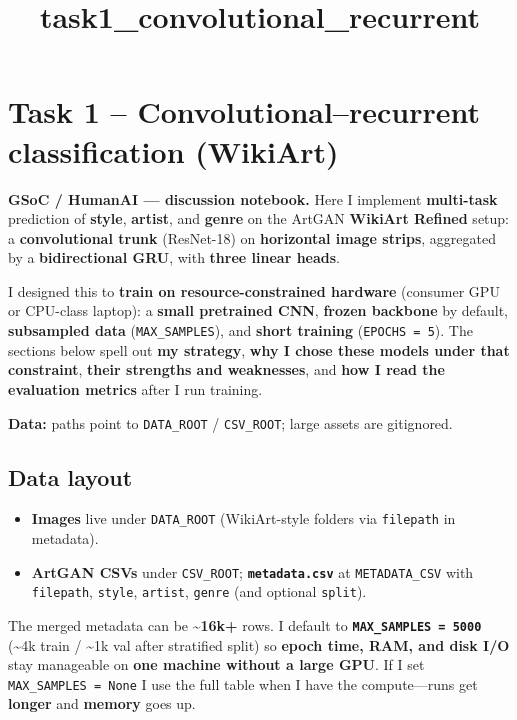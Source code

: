 \documentclass[11pt]{article}
\title{task1\_convolutional\_recurrent}
\providecommand{\tightlist}{%
      \setlength{\itemsep}{0pt}\setlength{\parskip}{0pt}}
\begin{document}
    
    \maketitle
    
    

    
    \section{Task 1 -- Convolutional--recurrent classification
(WikiArt)}\label{task-1-convolutionalrecurrent-classification-wikiart}

\textbf{GSoC / HumanAI --- discussion notebook.} Here I implement
\textbf{multi-task} prediction of \textbf{style}, \textbf{artist}, and
\textbf{genre} on the ArtGAN \textbf{WikiArt Refined} setup: a
\textbf{convolutional trunk} (ResNet-18) on \textbf{horizontal image
strips}, aggregated by a \textbf{bidirectional GRU}, with \textbf{three
linear heads}.

I designed this to \textbf{train on resource-constrained hardware}
(consumer GPU or CPU-class laptop): a \textbf{small pretrained CNN},
\textbf{frozen backbone} by default, \textbf{subsampled data}
(\texttt{MAX\_SAMPLES}), and \textbf{short training}
(\texttt{EPOCHS\ =\ 5}). The sections below spell out \textbf{my
strategy}, \textbf{why I chose these models under that constraint},
\textbf{their strengths and weaknesses}, and \textbf{how I read the
evaluation metrics} after I run training.

\textbf{Data:} paths point to \texttt{DATA\_ROOT} / \texttt{CSV\_ROOT};
large assets are gitignored.

    \subsection{Data layout}\label{data-layout}

\begin{itemize}
\tightlist
\item
  \textbf{Images} live under \texttt{DATA\_ROOT} (WikiArt-style folders
  via \texttt{filepath} in metadata).
\item
  \textbf{ArtGAN CSVs} under \texttt{CSV\_ROOT};
  \textbf{\texttt{metadata.csv}} at \texttt{METADATA\_CSV} with
  \texttt{filepath}, \texttt{style}, \texttt{artist}, \texttt{genre}
  (and optional \texttt{split}).
\end{itemize}

The merged metadata can be \textbf{\textasciitilde16k+} rows. I default
to \textbf{\texttt{MAX\_SAMPLES\ =\ 5000}} (\textasciitilde4k train /
\textasciitilde1k val after stratified split) so \textbf{epoch time,
RAM, and disk I/O} stay manageable on \textbf{one machine without a
large GPU}. If I set \texttt{MAX\_SAMPLES\ =\ None} I use the full table
when I have the compute---runs get \textbf{longer} and \textbf{memory}
goes up.
\end{document}
